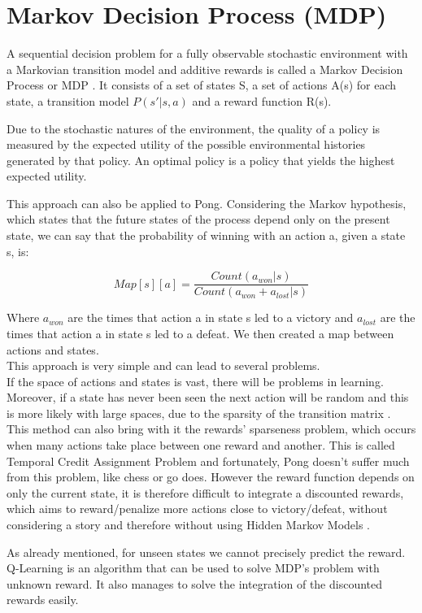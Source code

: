 \section{Markov Decision Process (MDP)}

A sequential decision problem for a fully observable stochastic environment with a Markovian transition model and additive rewards is called a Markov Decision Process or MDP \cite{russell2002artificial}.
It consists of a set of states S, a set of actions A(s) for each state, a transition model
$P(s' | s, a)$ and a reward function R(s).

Due to the stochastic natures of the environment, the quality of a policy is measured by the expected utility of the possible environmental histories generated by that policy. An optimal policy is a policy that yields the highest expected utility.

This approach can also be applied to Pong.
Considering the Markov hypothesis, which states that the future states of the process depend only on the present state, we can say that the probability of winning with an action a, given a state s, is:

\[ { Map[s][a] = \frac{ Count(a_{won} | s) }{ Count(a_{won} + a_{lost} | s) } } \]

Where $a_{won}$ are the times that action a in state s led to a victory and
$a_{lost}$ are the times that action a in state s led to a defeat.
We then created a map between actions and states. \\

This approach is very simple and can lead to several problems. \\
If the space of actions and states is vast, there will be problems in learning.
Moreover, if a state has never been seen the next action will be random and this is more
likely with large spaces, due to the sparsity of the transition matrix \cite{silver2015}.
This method can also bring with it the rewards' sparseness problem, which occurs when many
actions take place between one reward and another. This is called Temporal Credit Assignment Problem \cite{sutton1984temporal}
and fortunately, Pong doesn't suffer much from this problem, like chess or go does.
However the reward function depends on only the current state, it is
therefore difficult to integrate a discounted rewards, which aims to reward/penalize
more actions close to victory/defeat, without considering a story and therefore
without using Hidden Markov Models \cite{silver2015}.

As already mentioned, for unseen states we cannot precisely predict the reward.
Q-Learning is an algorithm that can be used to solve MDP's problem with unknown reward.
It also manages to solve the integration of the discounted rewards easily.
